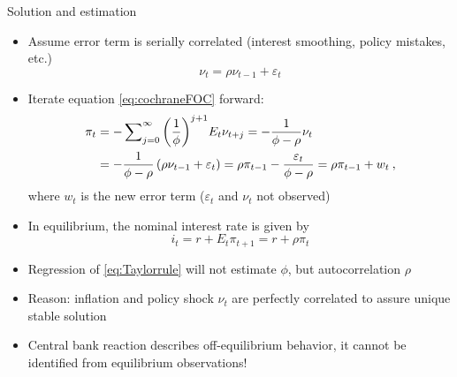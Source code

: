 \documentclass[handout,usepdftitle=false,xcolor=dvipsnames,aspectratio=169]{beamer}
\begin{document}
\begin{frame}{Solution and estimation}
  \begin{itemize}
    \item Assume error term is serially correlated (interest smoothing, policy mistakes, etc.) \vspace{-.2cm}
          \begin{equation}
            {\nu _t} = \rho {\nu _{t - 1}} + {\varepsilon _t}
          \end{equation}
    \item Iterate equation \eqref{eq:cochraneFOC} forward:
          \begin{align}
            {\pi _t} & =  - \sum\nolimits_{j = 0}^\infty  {{{\left( {\frac{1}{\phi }} \right)}^{j + 1}}{E_t}{\nu _{t + j}}}  =  - \frac{1}{{\phi  - \rho }}{\nu _t} \notag                                         \\
                     & =  - \frac{1}{{\phi  - \rho }}\left( {\rho {\nu _{t - 1}} + {\varepsilon _t}} \right) = \rho {\pi _{t - 1}} - \frac{{{\varepsilon _t}}}{{\phi  - \rho }} = \rho {\pi _{t - 1}} + {w_t} \: ,
          \end{align}
          where $w_t$ is the new error term ($\varepsilon _t$ and $\nu_t$ not observed)
    \item In equilibrium, the nominal interest rate is given by \vspace{-.2cm}
          \begin{equation}
            {i_t} = r + {E_t}{\pi _{t + 1}} = r + \rho {\pi _t}
          \end{equation}
    \item Regression of \eqref{eq:Taylorrule} will not estimate $\phi$, but autocorrelation $\rho$
    \item Reason: inflation and policy shock $\nu_t$ are perfectly correlated to assure unique stable solution
    \item Central bank reaction describes off-equilibrium behavior, it cannot be identified from equilibrium observations!
  \end{itemize}
\end{frame}
\end{document}
